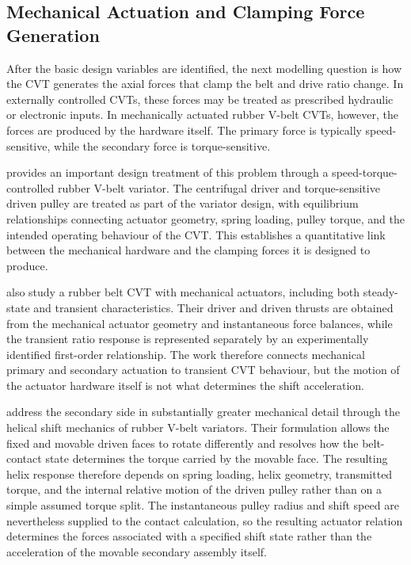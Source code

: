 \documentclass[11pt]{report}
\numberwithin{equation}{section}
\begin{document}
\subsection{Mechanical Actuation and Clamping Force Generation}
\label{sec:lit-actuation}

After the basic design variables are identified, the next modelling question is how the CVT generates the axial forces that clamp the belt and drive ratio change. In externally controlled CVTs, these forces may be treated as prescribed hydraulic or electronic inputs. In mechanically actuated rubber V-belt CVTs, however, the forces are produced by the hardware itself. The primary force is typically speed-sensitive, while the secondary force is torque-sensitive.

\citet{Cammalleri2005} provides an important design treatment of this problem through a speed-torque-controlled rubber V-belt variator. The centrifugal driver and torque-sensitive driven pulley are treated as part of the variator design, with equilibrium relationships connecting actuator geometry, spring loading, pulley torque, and the intended operating behaviour of the CVT. This establishes a quantitative link between the mechanical hardware and the clamping forces it is designed to produce.

\citet{KimEtAl2002} also study a rubber belt CVT with mechanical actuators, including both steady-state and transient characteristics. Their driver and driven thrusts are obtained from the mechanical actuator geometry and instantaneous force balances, while the transient ratio response is represented separately by an experimentally identified first-order relationship. The work therefore connects mechanical primary and secondary actuation to transient CVT behaviour, but the motion of the actuator hardware itself is not what determines the shift acceleration.

\citet{SorgeCammalleri2011} address the secondary side in substantially greater mechanical detail through the helical shift mechanics of rubber V-belt variators. Their formulation allows the fixed and movable driven faces to rotate differently and resolves how the belt-contact state determines the torque carried by the movable face. The resulting helix response therefore depends on spring loading, helix geometry, transmitted torque, and the internal relative motion of the driven pulley rather than on a simple assumed torque split. The instantaneous pulley radius and shift speed are nevertheless supplied to the contact calculation, so the resulting actuator relation determines the forces associated with a specified shift state rather than the acceleration of the movable secondary assembly itself.
\end{document}
